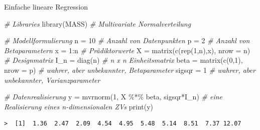 \documentclass[
  8pt,
  ignorenonframetext,
]{beamer}
\newenvironment{Shaded}{\begin{snugshade}}{\end{snugshade}}
\newcommand{\AttributeTok}[1]{\textcolor[rgb]{0.77,0.63,0.00}{#1}}
\newcommand{\CommentTok}[1]{\textcolor[rgb]{0.56,0.35,0.01}{\textit{#1}}}
\newcommand{\DecValTok}[1]{\textcolor[rgb]{0.00,0.00,0.81}{#1}}
\newcommand{\FunctionTok}[1]{\textcolor[rgb]{0.00,0.00,0.00}{#1}}
\newcommand{\NormalTok}[1]{#1}
\newcommand{\OtherTok}[1]{\textcolor[rgb]{0.56,0.35,0.01}{#1}}
\newcommand{\SpecialCharTok}[1]{\textcolor[rgb]{0.00,0.00,0.00}{#1}}
\begin{document}
\begin{frame}[fragile]{Einfache lineare Regression}
\protect\hypertarget{einfache-lineare-regression-1}{}
\footnotesize

\begin{Shaded}
\begin{Highlighting}[]
\CommentTok{\# Libraries }
\FunctionTok{library}\NormalTok{(MASS)                                }\CommentTok{\# Multivariate Normalverteilung}

\CommentTok{\# Modellformulierung}
\NormalTok{n      }\OtherTok{=} \DecValTok{10}                                  \CommentTok{\# Anzahl von Datenpunkten}
\NormalTok{p      }\OtherTok{=} \DecValTok{2}                                   \CommentTok{\# Anzahl von Betaparametern}
\NormalTok{x      }\OtherTok{=} \DecValTok{1}\SpecialCharTok{:}\NormalTok{n                                 }\CommentTok{\# Prädiktorwerte}
\NormalTok{X      }\OtherTok{=} \FunctionTok{matrix}\NormalTok{(}\FunctionTok{c}\NormalTok{(}\FunctionTok{rep}\NormalTok{(}\DecValTok{1}\NormalTok{,n),x), }\AttributeTok{nrow =}\NormalTok{ n)     }\CommentTok{\# Designmatrix}
\NormalTok{I\_n    }\OtherTok{=} \FunctionTok{diag}\NormalTok{(n)                             }\CommentTok{\# n x n Einheitsmatrix}
\NormalTok{beta   }\OtherTok{=} \FunctionTok{matrix}\NormalTok{(}\FunctionTok{c}\NormalTok{(}\DecValTok{0}\NormalTok{,}\DecValTok{1}\NormalTok{), }\AttributeTok{nrow =}\NormalTok{ p)            }\CommentTok{\# wahrer, aber unbekannter, Betaparameter}
\NormalTok{sigsqr }\OtherTok{=} \DecValTok{1}                                   \CommentTok{\# wahrer, aber unbekannter, Varianzparameter}

\CommentTok{\# Datenrealisierung}
\NormalTok{y      }\OtherTok{=} \FunctionTok{mvrnorm}\NormalTok{(}\DecValTok{1}\NormalTok{, X }\SpecialCharTok{\%*\%}\NormalTok{ beta, sigsqr}\SpecialCharTok{*}\NormalTok{I\_n)  }\CommentTok{\# eine Realisierung eines n{-}dimensionalen ZVs}
\FunctionTok{print}\NormalTok{(y)}
\end{Highlighting}
\end{Shaded}

\begin{verbatim}
>  [1]  1.36  2.47  2.09  4.54  4.95  5.48  5.14  8.51  7.37 12.07
\end{verbatim}
\end{frame}
\end{document}
